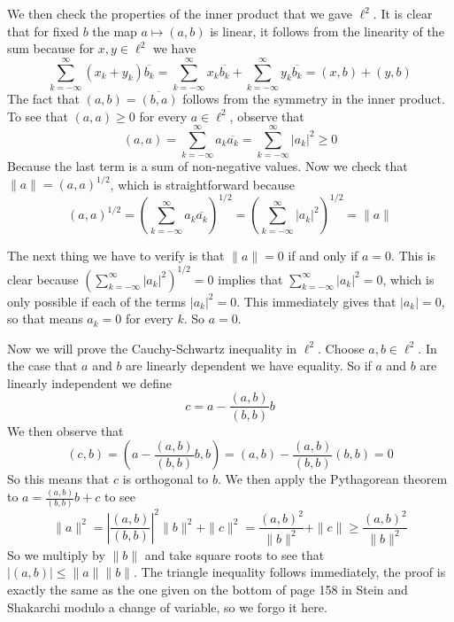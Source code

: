\documentclass{article}
\newcommand{\norm}[1]{\|#1\|}
\begin{document}
We then check the properties of the inner product that we gave $\ell^2$. It is clear that for fixed $b$ the map $a \mapsto (a,b)$ is linear, it follows from the linearity of the sum because for $x,y \in \ell^2$ we have
\[
\sum_{k=-\infty}^\infty (x_k + y_k)\overline{b_k} = \sum_{k=-\infty}^\infty x_k\overline{b_k} + \sum_{k=-\infty}^\infty y_k\overline{b_k} = (x,b) + (y,b)
\]
The fact that $(a,b) = \overline{(b,a)}$ follows from the symmetry in the inner product. To see that $(a,a) \geq 0$ for every $a \in \ell^2$, observe that 
\[
(a,a) = \sum_{k=-\infty}^\infty a_k\overline{a_k} = \sum_{k=-\infty}^\infty |a_k| ^2 \geq 0
\]
Because the last term is a sum of non-negative values. Now we check that $\norm{a} = (a,a)^{1/2}$, which is straightforward because
\[
(a,a)^{1/2} = \left(\sum_{k=-\infty}^\infty a_k\overline{a_k}\right)^{1/2} = \left(\sum_{k=-\infty}^\infty |a_k|^2\right)^{1/2} = \norm{a}
\]

The next thing we have to verify is that $\norm{a} = 0$ if and only if $a = 0$. This is clear because $\left(\sum_{k=-\infty}^\infty |a_k|^2\right)^{1/2} = 0$ implies that $\sum_{k=-\infty}^\infty |a_k|^2 = 0$, which is only possible if each of the terms $|a_k|^2 = 0$. This immediately gives that $|a_k| = 0$, so that means $a_k = 0$ for every $k$. So $a = 0$. 

Now we will prove the Cauchy-Schwartz inequality in $\ell^2$. Choose $a,b \in \ell^2$. In the case that $a$ and $b$ are linearly dependent we have equality. So if $a$ and $b$ are linearly independent we define
\[
c = a - \frac{(a,b)}{(b,b)}b
\]
We then observe that
\[
(c,b) = \left( a - \frac{(a,b)}{(b,b)}b, b\right) = (a,b) - \frac{(a,b)}{(b,b)}(b,b) = 0
\]
So this means that $c$ is orthogonal to $b$. We then apply the Pythagorean theorem to $a = \frac{(a,b)}{(b,b)}b + c$ to see
\[
\norm{a}^2 = \left| \frac{(a,b)}{(b,b)}\right|^2\norm{b}^2 + \norm{c}^2 = \frac{(a,b)^2}{\norm{b}^2} + \norm{c} \geq \frac{(a,b)^2}{\norm{b}^2} 
\]
So we multiply by $\norm{b}$ and take square roots to see that $|(a,b)| \leq \norm{a}\norm{b}$. The triangle inequality follows immediately, the proof is exactly the same as the one given on the bottom of page 158 in Stein and Shakarchi modulo a change of variable, so we forgo it here. 
\end{document}
